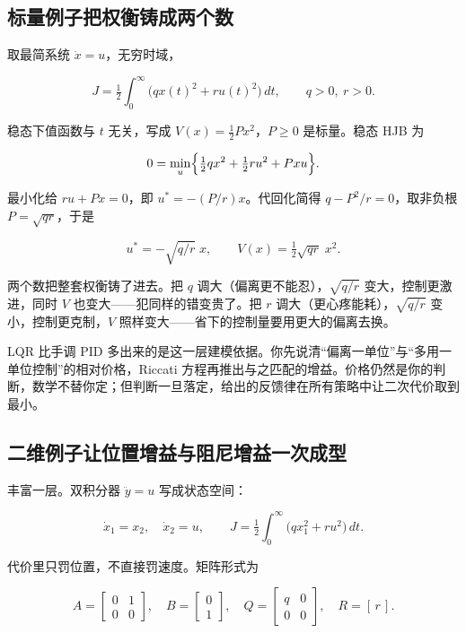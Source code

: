 \subsection{标量例子把权衡铸成两个数}

取最简系统 \(\dot x = u\)，无穷时域，

\[
J = \tfrac12\int_0^\infty \bigl( q x(t)^2 + r u(t)^2 \bigr)\, dt, \qquad q>0,\ r>0.
\]

稳态下值函数与 \(t\) 无关，写成 \(V(x) = \tfrac12 P x^2\)，\(P\ge 0\) 是标量。稳态 HJB 为

\[
0 = \min_u \Bigl\{ \tfrac12 q x^2 + \tfrac12 r u^2 + P x u \Bigr\}.
\]

最小化给 \(ru + Px = 0\)，即 \(u^* = -(P/r)x\)。代回化简得 \(q - P^2/r = 0\)，取非负根 \(P=\sqrt{qr}\)，于是

\[
u^* = -\sqrt{q/r}\; x, \qquad V(x) = \tfrac12\sqrt{qr}\; x^2 .
\]

两个数把整套权衡铸了进去。把 \(q\) 调大（偏离更不能忍），\(\sqrt{q/r}\) 变大，控制更激进，同时 \(V\) 也变大——犯同样的错变贵了。把 \(r\) 调大（更心疼能耗），\(\sqrt{q/r}\) 变小，控制更克制，\(V\) 照样变大——省下的控制量要用更大的偏离去换。

LQR 比手调 PID 多出来的是这一层建模依据。你先说清``偏离一单位''与``多用一单位控制''的相对价格，Riccati 方程再推出与之匹配的增益。价格仍然是你的判断，数学不替你定；但判断一旦落定，给出的反馈律在所有策略中让二次代价取到最小。

\subsection{二维例子让位置增益与阻尼增益一次成型}

丰富一层。双积分器 \(\ddot y = u\) 写成状态空间：

\[
\dot x_1 = x_2, \quad \dot x_2 = u, \qquad
J = \tfrac12\int_0^\infty \bigl( q x_1^2 + r u^2 \bigr)\, dt .
\]

代价里只罚位置，不直接罚速度。矩阵形式为

\[
A = \begin{bmatrix} 0 & 1 \\ 0 & 0\end{bmatrix},\quad
B = \begin{bmatrix} 0 \\ 1\end{bmatrix},\quad
Q = \begin{bmatrix} q & 0 \\ 0 & 0\end{bmatrix},\quad
R = [\,r\,].
\]

